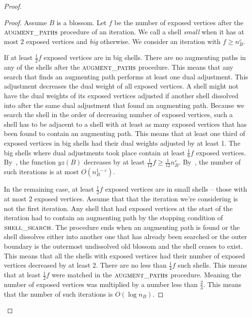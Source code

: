 \begin{proof}
\begin{proof}
    Assume $B$ is a blossom. Let $f$ be the number of exposed vertices after the $\textsc{augment\_paths}$ procedure of an iteration. We call a shell \textit{small} when it has at most $2$ exposed vertices and \textit{big} otherwise. We consider an iteration with $f \geq n_B^\varepsilon$.

    If at least $\frac{1}{2}f$ exposed vertices are in big shells. There are no augmenting paths in any of the shells after the $\textsc{augment\_paths}$ procedure. This means that any search that finds an augmenting path performs at least one dual adjustment. This adjustment decreases the dual weight of all exposed vertices. A shell might not have the dual weights of its exposed vertices adjusted if another shell dissolved into after the same dual adjustment that found an augmenting path. Because we search the shell in the order of decreasing number of exposed vertices, such a shell has to be adjacent to a shell with at least as many exposed vertices that has been found to contain an augmenting path. This means that at least one third of exposed vertices in big shells had their dual weights adjusted by at least 1. The big shells where dual adjustments took place contain at least $\frac{1}{6}f$ exposed vertices. By~, the function $yz(B)$ decreases by at least $\frac{1}{12}f \geq \frac{1}{12}n_B^\varepsilon$. By~, the number of such iterations is at most $O(n_B^{1-\varepsilon})$.

    In the remaining case, at least $\frac{1}{2}f$ exposed vertices are in small shells – those with at most 2 exposed vertices. Assume that that the iteration we're considering is not the first iteration. Any shell that had exposed vertices at the start of the iteration had to contain an augmenting path by the stopping condition of $\textsc{shell\_search}$. The procedure ends when an augmenting path is found or the shell dissolves either into another one that has already been searched or the outer boundary is the outermost undissolved old blossom and the shell ceases to exist. This means that all the shells with exposed vertices had their number of exposed vertices decreased by at least 2. There are no less than $\frac{1}{4}f$ such shells. This means that at least $\frac{1}{2}f$ were matched in the $\textsc{augment\_paths}$ procedure. Meaning the number of exposed vertices was multiplied by a number less than $\frac{2}{3}$. This means that the number of such iterations is $O(\log n_B)$.
\end{proof}


\end{proof}
